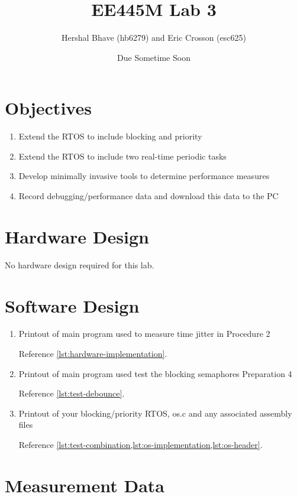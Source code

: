 \documentclass[12pt]{article}
\title{EE445M Lab 3}
\author{Hershal Bhave (hb6279) and Eric Crosson (esc625)}
\date{Due Sometime Soon}
\begin{document}
\maketitle

\section{Objectives}
\begin{enumerate}
\item Extend the RTOS to include blocking and priority
\item Extend the RTOS to include two real-time periodic tasks
\item Develop minimally invasive tools to determine performance
  measures
\item Record debugging/performance data and download this data to the
  PC
\end{enumerate}

\section{Hardware Design}
No hardware design required for this lab.

\section{Software Design}
\begin{enumerate}
\item Printout of main program used to measure time jitter in
  Procedure 2

Reference \cref{lst:hardware-implementation}.
\item Printout of main program used test the blocking semaphores Preparation 4

Reference \cref{lst:test-debounce}.
\item Printout of your blocking/priority RTOS, os.c and any associated assembly files

Reference \cref{lst:test-combination,lst:os-implementation,lst:os-header}.
\end{enumerate}
\section{Measurement Data}
\end{document}
